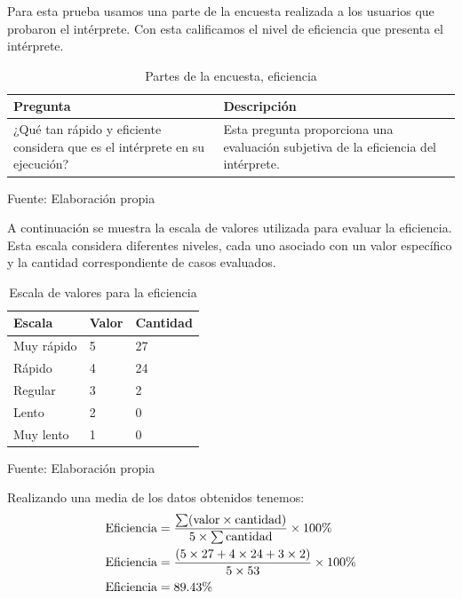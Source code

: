Para esta prueba usamos una parte de la encuesta realizada a los usuarios que probaron el intérprete. Con esta calificamos el nivel de eficiencia que presenta el intérprete.
\begin{table}[!h]
  \begin{center}
    \begin{tabularx}{0.9\textwidth}{|X|X|}
      \hline
      \textbf{Pregunta} & \textbf{Descripción} \\
      \hline
      ¿Qué tan rápido y eficiente considera que es el intérprete en su ejecución? & Esta pregunta proporciona una evaluación subjetiva de la eficiencia del intérprete. \\
      \hline
    \end{tabularx}
  \end{center}
  \caption{Partes de la encuesta, eficiencia}
  \centering Fuente: Elaboración propia
  \label{tab:eficiencia}
\end{table}
\newpage
A continuación se muestra la escala de valores utilizada para evaluar la eficiencia. Esta escala considera diferentes niveles, cada uno asociado con un valor específico y la cantidad correspondiente de casos evaluados.

\begin{table}[!h]
  \begin{center}
    \begin{tabularx}{0.9\textwidth}{|X|X|X|}
      \hline
      \textbf{Escala} & \textbf{Valor} & \textbf{Cantidad} \\
      \hline
      Muy rápido & 5 & 27 \\
      \hline
      Rápido & 4 & 24 \\
      \hline
      Regular & 3 & 2 \\
      \hline
      Lento & 2 & 0 \\
      \hline
      Muy lento & 1 & 0 \\
      \hline
    \end{tabularx}
  \end{center}
  \caption{Escala de valores para la eficiencia}
  \centering Fuente: Elaboración propia
  \label{tab:eficiencia-escala}
\end{table}

Realizando una media de los datos obtenidos tenemos:
\begin{equation*}
  \begin{split}
    \textnormal{Eficiencia} & = \frac{\sum (\textnormal{valor} \times \textnormal{cantidad})}{5 \times \sum \textnormal{cantidad}} \times 100\% \\
    \textnormal{Eficiencia} & = \frac{(5 \times 27 + 4 \times 24 + 3 \times 2)}{5 \times 53} \times 100\% \\
    \textnormal{Eficiencia} & = 89.43\%
  \end{split}
\end{equation*}

